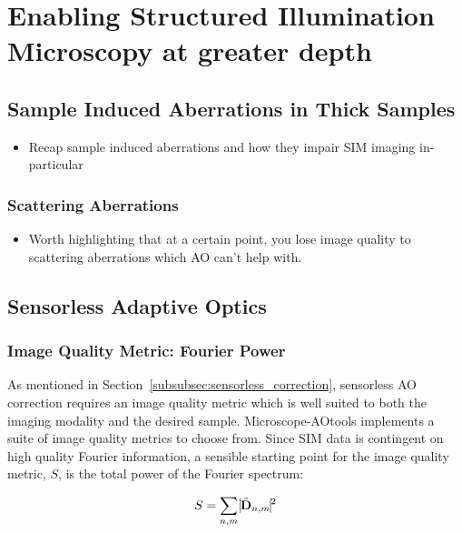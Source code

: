 \chapter{Enabling Structured Illumination Microscopy at greater depth}

\section{Sample Induced Aberrations in Thick Samples}
\label{sec:sample_aberrations_thick}

\begin{itemize}
	\item Recap sample induced aberrations and how they impair SIM imaging in-particular
\end{itemize}

\subsection{Scattering Aberrations}
\label{subsec:scattering}

\begin{itemize}
	\item Worth highlighting that at a certain point, you lose image quality to scattering aberrations which AO can't help with.
\end{itemize}

\section{Sensorless Adaptive Optics}
\label{sec:sensorless_AO}

\subsection{Image Quality Metric: Fourier Power}
\label{subsec:fourier_power_metric}

As mentioned in Section~\ref{subsubsec:sensorless_correction}, 
sensorless AO correction requires an image quality metric which
is well suited to both the imaging modality and the desired 
sample. Microscope-AOtools implements a suite of image quality
metrics to choose from. Since SIM data is contingent on high
quality Fourier information, a sensible starting point for 
the image quality metric, $S$, is the total power of the Fourier
spectrum:

\begin{equation}\label{eq:fourier_power_spectrum}
S = \sum\limits_{n,m}{\vline \tilde{\textbf{D}}_{n,m} \vline^2}
\end{equation}

